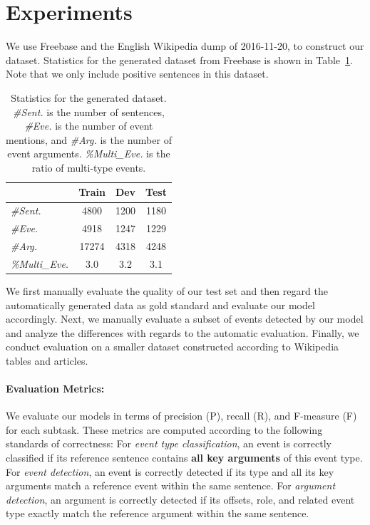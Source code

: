 \section{Experiments}
We use Freebase and the English Wikipedia dump of 2016-11-20, to construct our dataset. Statistics for the generated dataset from Freebase is shown in Table~\ref{statistics}. Note that we only include positive sentences in this dataset. 
\begin{table}
\small
\centering
\begin{tabular}{|l|c|c|c|} \hline
& Train & Dev & Test \\ \hline
\emph{\#Sent.} & 4800 & 1200 & 1180 \\ \hline
\emph{\#Eve.} & 4918 & 1247 & 1229 \\ \hline
\emph{\#Arg.} & 17274 & 4318 & 4248 \\ \hline
\emph{\%Multi\_Eve.} & 3.0 & 3.2 & 3.1 \\ \hline
\end{tabular}	
\caption{Statistics for the generated dataset. \emph{\#Sent.} is the number of sentences, \emph{\#Eve.} is the number of event mentions, and \emph{\#Arg.} is the number of event arguments. \emph{\%Multi\_Eve.} is the ratio of multi-type events.
\label{statistics}}
\end{table}
We first manually evaluate the quality of our test set and then regard the automatically generated data as gold standard and evaluate our model accordingly. Next, we manually evaluate a subset of events detected by our model and analyze the differences with regards to the automatic evaluation. Finally, we conduct evaluation on a smaller dataset constructed according to Wikipedia tables and articles. 

\paragraph{Evaluation Metrics:} We evaluate our models in terms of precision (P), recall (R), and F-measure (F) for each subtask. These metrics are computed according to the following standards of correctness: 
For \emph{event type classification}, an event is correctly classified if its reference sentence contains \textbf{all key arguments} of this event type. 
For \emph{event detection}, an event is correctly detected if its type and all its key arguments match a reference event within the same sentence.
For \emph{argument detection}, an argument is correctly detected if its offsets, role, and related event type exactly match the reference argument within the same sentence. 

